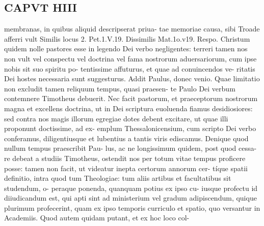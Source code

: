 \documentclass{article}
\begin{document}
\begin{pages}
\section*{CAPVT  HIII }
\marginpar{[ p.233 ]}membranas, in quibus aliquid descripserat priua- tae memoriae causa, sibi Troade afferri vult Similis locus 2. Pet.1.V.19. Dissimilis Mat.1o.v19. Respo. Christum quidem nolle pastores esse in legendo Dei verbo negligentes: terreri tamen nos non vult vel conspectu vel doctrina vel fama nostrorum aduersariorum, cum ipse nobis sit suo spiritu po- tentissime affuturus, et quae ad conuincendos ve- ritatis Dei hostes necessaria sunt suggesturus. Addit Paulus, donec venio. Quae limitatio non excludit tamen reliquum tempus, quasi praesen- te Paulo Dei verbum contemnere Timotheus debuerit. Nec facit pastorum, et praeceptorum nostrorum magna et excellens doctrina, ut in Dei scriptura euoluenda fiamus desidiosiores: sed contra nos magis illorum egregiae dotes debent excitare, ut quae illi proponunt doctissime, ad ex- emplum Thessalonicensium, cum scripto Dei verbo conferamus, diligentiusque et lubentius a tantis viris ediscamus. Denique quod nullum tempus praescribit Pau- lus, ac ne longissimum quidem, post quod cessa- re debeat a studiis Timotheus, ostendit nos per totum vitae tempus proficere posse: tamen non facit, ut videatur inepta certorum annorum cer- tíque spatii definitio, intra quod tum Theologiae: tum aliis artibus et facultatibus sit studendum, o- peraque ponenda, quanquam potius ex ipso cu- iusque profectu id diiudicandum est, qui apti sint ad ministerium vel gradum adipiscendum, quique plurimum profecerint, quam ex ipso temporis curriculo et spatio, quo versantur in Academiis. Quod autem quidam putant, et ex hoc loco col- 

\end{pages}
\end{document}
